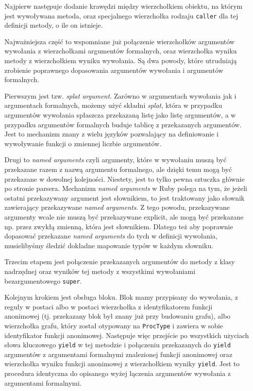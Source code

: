 \documentclass[declaration,shortabstract]{iithesis}
\begin{document}
Najpierw następuje dodanie krawędzi między wierzchołkiem obiektu, na którym jest wywoływana metoda, oraz specjalnego wierzchołka rodzaju \texttt{caller} dla tej definicji metody, o ile on istnieje.

Najważniejsza część to wspomniane już połączenie wierzchołków argumentów wywołania z wierzchołkami argumentów formalnych, oraz wierzchołka wyniku metody z wierzchołkiem wyniku wywołania. Są dwa powody, które utrudniają zrobienie poprawnego dopasowania argumentów wywołania i argumentów formalnych.

Pierwszym jest tzw. \textit{splat argument}. Zarówno w argumentach wywołania jak i argumentach formalnych, możemy użyć składni \textit{splat}, która w przypadku argumentów wywołania spłaszcza przekazaną listę jako listę argumentów, a w przypadku argumentów formalnych buduje tablicę z przekazanych argumentów. Jest to mechanizm znany z wielu języków pozwalający na definiowanie i wywoływanie funkcji o zmiennej liczbie argumentów. 

Drugi to \textit{named arguments} czyli argumenty, które w wywołaniu muszą być przekazane razem z nazwą argumentu formalnego, ale dzięki temu mogą być przekazane w dowolnej kolejności. Niestety, jest to tylko pewna sztuczka głównie po stronie parsera. Mechanizm \textit{named arguments} w Ruby polega na tym, że jeżeli ostatni przekazywany argument jest słownikiem, to jest traktowany jako słownik zawierający przekazywane \textit{named arguments}. Z tego powodu, przekazywane argumenty wcale nie muszą być przekazywane explicit, ale mogą być przekazane np. przez zwykłą zmienną, która jest słownikiem. Dlatego też aby poprawnie dopasować przekazane \textit{named arguments} do tych w definicji wywołania, musielibyśmy śledzić dokładne mapowanie typów w każdym słowniku.

Trzecim etapem jest połączenie przekazanych argumentów do metody z klasy nadrzędnej oraz wyników tej metody z wszystkimi wywołaniami bezargumentowego \texttt{super}.

Kolejnym krokiem jest obsługa bloku. Blok mamy przypisany do wywołania, z reguły w postaci albo w postaci wierzchołka z identyfikatorem funkcji anonimowej (tj. przekazany blok był znany już przy budowaniu grafu), albo wierzchołka grafu, który został otypowany na \texttt{ProcType} i zawiera w sobie identyfikator funkcji anonimowej. Następuje więc przejście po wszystkich użyciach słowa kluczowego \texttt{yield} w tej metodzie i połączeniu przekazanych do \texttt{yield} argumentów z argumentami formalnymi znalezionej funkcji anonimowej oraz wierzchołka wyniku funkcji anonimowej z wierzchołkiem wyniky \texttt{yield}. Jest to procedura identyczna do opisanego wyżej łączenia argumentów wywołania z argumentami formalnymi.
\end{document}
